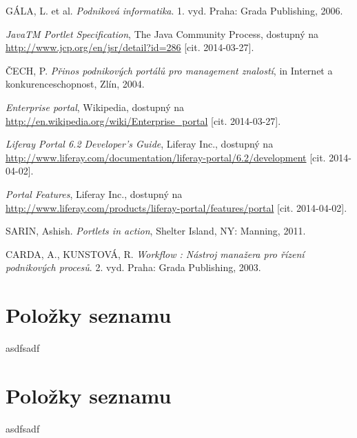 \documentclass{fithesis}
\begin{document}

\begin{thebibliography}{0}

GÁLA, L. et al. \textit{Podniková informatika}. 1. vyd. Praha: Grada Publishing, 2006. 

\textit{JavaTM Portlet Specification}, The Java Community Process, dostupný na \url{http://www.jcp.org/en/jsr/detail?id=286} [cit. 2014-03-27].

ČECH, P. \textit {Přinos podnikových portálů pro management znalostí}, in Internet a konkurenceschopnost, Zlín, 2004.

\textit{Enterprise portal}, Wikipedia, dostupný na \url{http://en.wikipedia.org/wiki/Enterprise_portal} [cit. 2014-03-27].

\textit{Liferay Portal 6.2 Developer's Guide}, Liferay Inc., dostupný na \url{http://www.liferay.com/documentation/liferay-portal/6.2/development} [cit. 2014-04-02].

\textit{Portal Features}, Liferay Inc., dostupný na \url{http://www.liferay.com/products/liferay-portal/features/portal} [cit. 2014-04-02].

SARIN, Ashish. \textit{Portlets in action}, Shelter Island, NY: Manning, 2011.

CARDA, A., KUNSTOVÁ, R. \textit {Workflow : Nástroj manažera pro řízení podnikových procesů}. 2. vyd. Praha: Grada Publishing, 2003.




\end{thebibliography}


\newpage
\appendix
\chapter{Položky seznamu}
asdfsadf

\chapter{Položky seznamu}
asdfsadf
\end{document}
